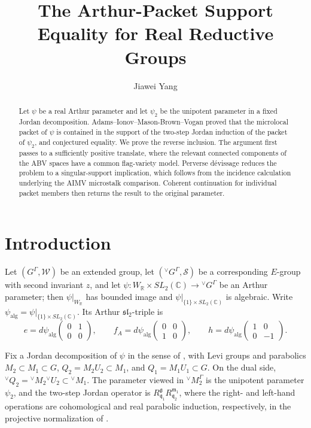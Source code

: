 \documentclass[10pt]{amsart}
\title[Arthur-packet support equality]
{The Arthur-Packet Support Equality for Real Reductive Groups}
\author{Jiawei Yang}
\numberwithin{equation}{section}
\theoremstyle{plain}
\theoremstyle{definition}
\theoremstyle{remark}
\newcommand{\CC}{\mathbb C}
\newcommand{\RR}{\mathbb R}
\newcommand{\fg}{\mathfrak g}
\newcommand{\fm}{\mathfrak m}
\newcommand{\fq}{\mathfrak q}
\newcommand{\vG}{{}^{\vee}G}
\newcommand{\vM}{{}^{\vee}M}
\newcommand{\vQ}{{}^{\vee}Q}
\newcommand{\vU}{{}^{\vee}U}
\begin{document}
\begin{abstract}
Let $\psi$ be a real Arthur parameter and let $\psi_2$ be the unipotent
parameter in a fixed Jordan decomposition. Adams--Ionov--Mason-Brown--Vogan
proved that the microlocal packet of $\psi$ is contained in the support of
the two-step Jordan induction of the packet of $\psi_2$, and conjectured
equality. We prove the reverse inclusion. The argument first passes to a
sufficiently positive translate, where the relevant connected components
of the ABV spaces have a common flag-variety model. Perverse d\'evissage reduces the problem to a
singular-support implication, which follows from the incidence calculation
underlying the AIMV microstalk comparison. Coherent continuation for
individual packet members then returns the result to the original parameter.
\end{abstract}

\maketitle

\section{Introduction}

Let $(G^\Gamma,\mathcal W)$ be an extended group, let $(\vG^\Gamma,\mathcal S)$ be a corresponding
$E$-group with second invariant $z$, and let $\psi\colon W_{\RR}\times SL_2(\CC)\longrightarrow \vG^\Gamma$
be an Arthur parameter; then $\psi|_{W_{\RR}}$ has bounded image and
$\psi|_{\{1\}\times SL_2(\CC)}$ is algebraic. Write
$\psi_{\mathrm{alg}}=\psi|_{\{1\}\times SL_2(\CC)}$. Its Arthur
$\mathfrak{sl}_2$-triple is
\[
 e=d\psi_{\mathrm{alg}}\begin{pmatrix}0&1\\0&0\end{pmatrix},
 \qquad
 f_A=d\psi_{\mathrm{alg}}\begin{pmatrix}0&0\\1&0\end{pmatrix},
 \qquad
 h=d\psi_{\mathrm{alg}}\begin{pmatrix}1&0\\0&-1\end{pmatrix}.
\]

Fix a Jordan decomposition of $\psi$ in the sense of
\cite[Definition~4.1.1]{AIMV26}, with Levi groups and parabolics
$M_2\subset M_1\subset G$, $Q_2=M_2U_2\subset M_1$, and
$Q_1=M_1U_1\subset G$.
On the dual side,
$\vQ_2=\vM_2\vU_2\subset\vM_1$. The parameter viewed in
$\vM_2^\Gamma$ is the unipotent parameter $\psi_2$, and the two-step
Jordan operator is $R_{\fq_1}^{\fg}R_{\fq_2}^{\fm_1}$, where the
right- and left-hand operations are cohomological and real parabolic
induction, respectively, in the projective normalization of
\cite[Sections~2.5--2.6]{AIMV26}.
\end{document}
